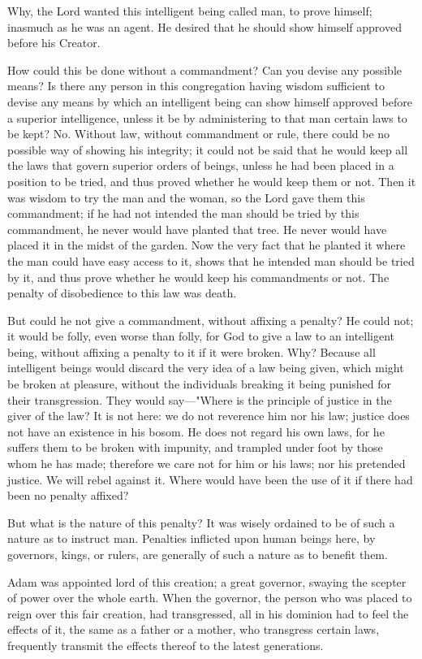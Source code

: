 Why, the Lord wanted this intelligent being called man, to prove himself; inasmuch as he
was an agent. He desired that he should show himself approved before his Creator.

How could this be done without a commandment? Can you devise any possible means? Is
there any person in this congregation having wisdom sufficient to devise any means by which
an intelligent being can show himself approved before a superior intelligence, unless it be by
administering to that man certain laws to be kept? No. Without law, without commandment
or rule, there could be no possible way of showing his integrity; it could not be said that he
would keep all the laws that govern superior orders of beings, unless he had been placed in a
position to be tried, and thus proved whether he would keep them or not. Then it was wisdom
to try the man and the woman, so the Lord gave them this commandment; if he had not
intended the man should be tried by this commandment, he never would have planted that
tree. He never would have placed it in the midst of the garden. Now the very fact that he
planted it where the man could have easy access to it, shows that he intended man should be
tried by it, and thus prove whether he would keep his commandments or not. The penalty of
disobedience to this law was death.

But could he not give a commandment, without affixing a penalty? He could not; it would be
folly, even worse than folly, for God to give a law to an intelligent being, without affixing a
penalty to it if it were broken. Why? Because all intelligent beings would discard the very
idea of a law being given, which might be broken at pleasure, without the individuals
breaking it being punished for their transgression. They would say—"Where is the principle
of justice in the giver of the law? It is not here: we do not reverence him nor his law; justice
does not have an existence in his bosom. He does not regard his own laws, for he suffers
them to be broken with impunity, and trampled under foot by those whom he has made;
therefore we care not for him or his laws; nor his pretended justice. We will rebel against it.
Where would have been the use of it if there had been no penalty affixed?

But what is the nature of this penalty? It was wisely ordained to be of such a nature as to
instruct man. Penalties inflicted upon human beings here, by governors, kings, or rulers, are
generally of such a nature as to benefit them.

Adam was appointed lord of this creation; a great governor, swaying the scepter of power
over the whole earth. When the governor, the person who was placed to reign over this fair
creation, had transgressed, all in his dominion had to feel the effects of it, the same as a
father or a mother, who transgress certain laws, frequently transmit the effects thereof to the
latest generations.

